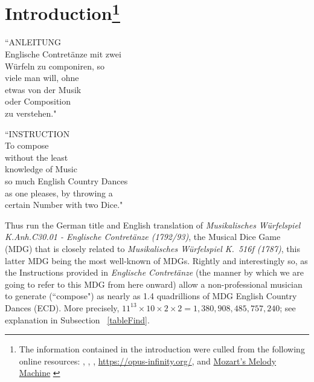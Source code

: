 \documentclass[letterpaper,x11names,svgnames,10pt]{article}
\begin{document}
\section[Introduction]{Introduction\footnote{The information contained in the introduction were culled from the following online resources:
	\citet{wiki_mw2017}, \citet{wam92}, \citet{kv2024}, 
	\url{https://opus-infinity.org/}, and 
	\href{https://www.sciencenews.org/article/mozarts-melody-machine-0}{Mozart's Melody Machine} \citep*{peterson2001}
	}
}
	\begin{center}
	\begin{minipage}{0.4\textwidth}
	\begin{flushleft}
		\begin{center}
			``ANLEITUNG\\
			Englische Contret\"{a}nze mit zwei\\
			W\"{u}rfeln zu componiren, so\\
			viele man will, ohne\\
			etwas von der Musik\\
			oder Composition\\
			zu verstehen."\\
		\end{center}
	\end{flushleft}
	\end{minipage}
	\begin{minipage}{0.4\textwidth}
	\begin{flushright}
		\begin{center}
		``INSTRUCTION\\
		To compose \\
		without the least \\ 
		knowledge of Music \\ 
		so much English Country Dances \\
		as one pleases, by throwing a \\
		certain Number with two Dice."
	\end{center}
	\end{flushright}
	\end{minipage}
	\end{center}

Thus run the German title and English translation of {\it Musikalisches W\"{u}rfelspiel K.Anh.C30.01 - Englische Contret\"{a}nze (1792/93)}, the Musical Dice Game (MDG) that is closely related to {\it Musikalisches W\"{u}rfelspiel K.\ 516f (1787)}, this latter MDG being the most well-known of MDGs.  Rightly and interestingly so, as the Instructions provided in {\it Englische Contret\"{a}nze} (the manner by which we are going to refer to this MDG from here onward) allow a non-professional musician to generate (``compose") as nearly as 1.4 quadrillions of MDG English Country Dances (ECD).  More precisely, $11^{13}\times 10 \times 2\times 2 = 1\!,380\!,908\!,485\!,757\!,240$; see explanation in Subsection ~\ref{tableFind}.\\  
\end{document}

